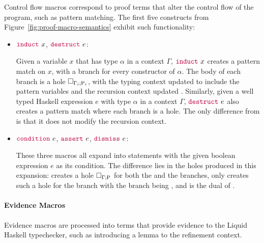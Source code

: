 Control flow macros correspond to proof terms that alter the control
flow of the program, such as pattern matching. The first five
constructs from Figure~\ref{fig:proof-macro-semantics} exhibit such
functionality:

\begin{itemize}
\item ${\color{purple}\mathtt{induct}} ~ x$, ${\color{purple}\mathtt{destruct}} ~ e$:

  Given a variable $x$ that has type $\alpha$ in a context $\Gamma$,
  ${\color{purple}\mathtt{induct}} ~ x$ creates a pattern match on $x$, with a branch
  for every constructor of $\alpha$. The body of each branch is a hole
  $\Box_{\Gamma_i ; \mathrm{P}_i}$, with the typing context updated to
  include the pattern variables and the recursion context updated
  . Similarly, given a well typed Haskell expression $e$ with
  type $\alpha$ in a context $\Gamma$, ${\color{purple}\mathtt{destruct}} ~ e$ also
  creates a pattern match where each branch is a hole. The only
  difference from  is that it does not modify the
  recursion context.

\item ${\color{purple}\mathtt{condition}} ~ e$, ${\color{purple}\mathtt{assert}} ~ e$, ${\color{purple}\mathtt{dismiss}} ~ e$:

  These three macros all expand into  statements with the given
  boolean expression $e$ as its condition. The difference lies in the
  holes produced in this expansion:  creates a hole
  $\Box_{\Gamma ; \mathrm{P}}$ for both the  and the 
  branches,  only creates such a hole for the 
  branch with the  branch being , and 
  is the dual of .
\end{itemize}

\paragraph{Evidence Macros}

Evidence macros are processed into terms that provide evidence to the
Liquid Haskell typechecker, such as introducing a lemma to the
refinement context.

